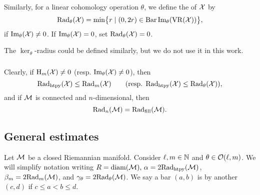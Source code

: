 Similarly, for a linear cohomology operation \(\theta\), we define the  of \(\cX\) by
\[
\firstdeath{\theta}{\cX} = \min\set[\big]{r \mid (0, 2r) \in \barc \img_\theta(\VR(\cX))},
\]
if \(\img_\theta(\cX) \neq 0\). 
If \(\img_\theta(\cX) = 0\), set $\firstdeath{\theta}{\cX} = 0$.

The \(\ker_\theta\)-radius could be defined similarly, but we do not use it in this work.


\subsubsection{}
\label{ss:beta v.s. fillrad}

Clearly, if \(\rH_m(\cX) \neq 0\) (resp. \(\img_\theta(\cX) \neq 0\)), then
\[
    \crit(\cX) \leq \firstdeath{m}{\cX} \qquad (\text{resp. }\crit(\cX) \leq  \firstdeath{\theta}{\cX}),
\]
and if $\cM$ is connected and $n$-dimensional, then
\[\firstdeath{n}{\cM} = \fillrad(\cM).\]


%


\subsection{General estimates}\label{ss:barcode_general}

Let \(\cM\) be a closed Riemannian manifold. 
Consider \(\ell, \degp \in \N\) and \(\theta \in \cO(\ell,\degp)\).
We will simplify notation writing \(R = \diam(\cM),\, \alpha = 2\crit(\cM)\), \(\beta_m = 2\firstdeath{\degp}{\cM}\), and \(\gamma_\theta = 2\firstdeath{\theta}{\cM}\). 
We say a bar $(a, b)$ is  by another $(c,d)$ if $c \leq a < b \leq d$.

